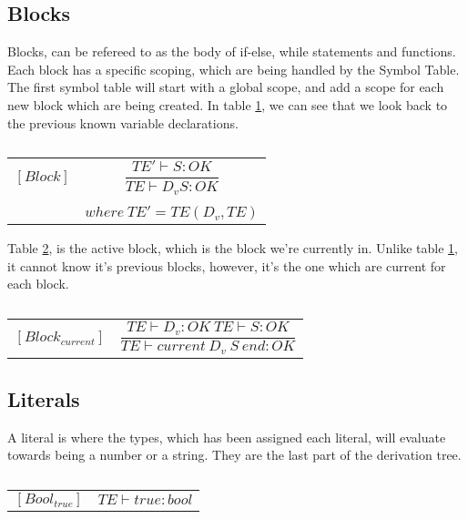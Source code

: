 \subsection{Blocks}
Blocks, can be refereed to as the body of if-else, while statements and functions. Each block has a specific scoping, which are being handled by the Symbol Table. The first symbol table will start with a global scope, and add a scope for each new block which are being created. In table \ref{block}, we can see that we look back to the previous known variable declarations. 
\begin{table}[H]
    \begin{center}
    \begin{longtable}[c] { r c }
        $[Block]$ 
        & 
        \( \dfrac{TE' \vdash S : OK} 
        {TE \vdash D_v S : OK} \) 
        \\ \\
        & 
        \( {where \ TE' = TE(D_v, TE)} \)
    \end{longtable}
    \caption{}\label{block}
        \end{center}
\end{table}

Table \ref{active-block}, is the active block, which is the block we're currently in. Unlike table \ref{block}, it cannot know it's previous blocks, however, it's the one which are current for each block.
\begin{table}[H]
    \begin{center}
    \begin{longtable}[c] { r c }
        $[Block_{current}]$ 
        & 
        \( \dfrac{TE \vdash D_{v} : OK \ TE \vdash S : OK} 
        {TE \vdash current \ D_{v} \ S \ end  :  OK} \)
    \end{longtable}
    \caption{}\label{active-block}
        \end{center}
\end{table}

\subsection{Literals}
A literal is where the types, which has been assigned each literal, will evaluate towards being a number or a string. They are the last part of the derivation tree.

\begin{table}[H]
    \centering
    \begin{longtable}[c] { r c }
        $[Bool_{true}]$ & 
        \( {TE \vdash true : bool} \) \\
    \end{longtable}
    \caption{}\label{s-empty}
\end{table}

